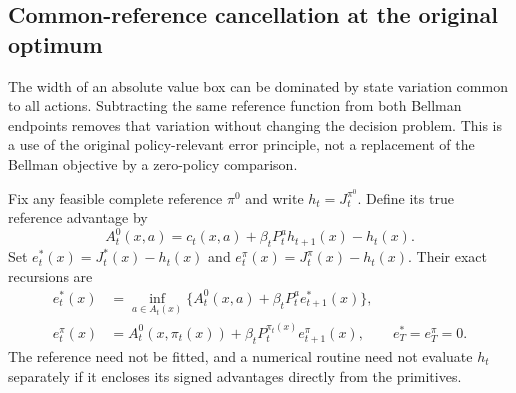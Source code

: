\subsection{Common-reference cancellation at the original optimum}\label{sec:centered60}
The width of an absolute value box can be dominated by state variation common to all actions. Subtracting the same reference function from both Bellman endpoints removes that variation without changing the decision problem. This is a use of the original policy-relevant error principle, not a replacement of the Bellman objective by a zero-policy comparison.

Fix any feasible complete reference $\pi^0$ and write $h_t=J_t^{\pi^0}$. Define its true reference advantage by
\[
 A_t^0(x,a)=c_t(x,a)+\beta_tP_t^a h_{t+1}(x)-h_t(x).
\]
Set $e_t^*(x)=J_t^*(x)-h_t(x)$ and $e_t^\pi(x)=J_t^\pi(x)-h_t(x)$. Their exact recursions are
\begin{align*}
 e_t^*(x)&=\inf_{a\in A_t(x)}
       \{A_t^0(x,a)+\beta_tP_t^a e_{t+1}^*(x)\},\\
 e_t^\pi(x)&=A_t^0(x,\pi_t(x))
             +\beta_tP_t^{\pi_t(x)}e_{t+1}^\pi(x),
 \qquad e_T^*=e_T^\pi=0.
\end{align*}
The reference need not be fitted, and a numerical routine need not evaluate $h_t$ separately if it encloses its signed advantages directly from the primitives.

